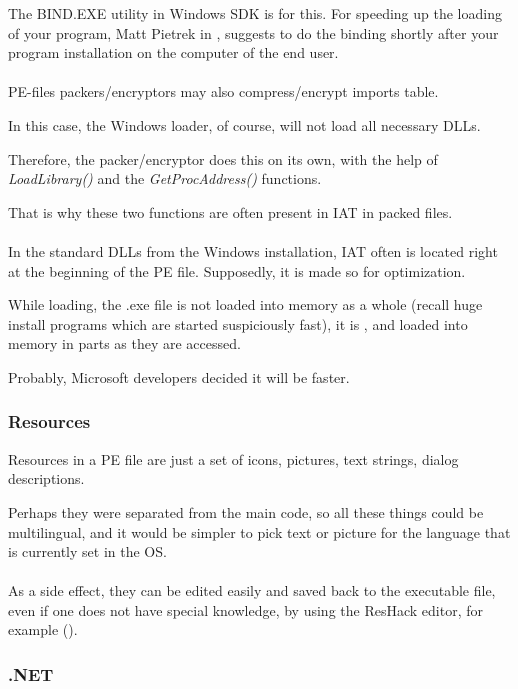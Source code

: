 The BIND.EXE utility in Windows SDK is for this.
For speeding up the loading of your program, Matt Pietrek in \PietrekPEURL, suggests to do the binding shortly after your program
installation on the computer of the end user. \\
\\
PE-files packers/encryptors may also compress/encrypt imports table.

In this case, the Windows loader, of course, will not load all necessary DLLs.

Therefore, the packer/encryptor does this on its own, with the help of
\emph{LoadLibrary()} and the \emph{GetProcAddress()} functions.

That is why these two functions are often present in \ac{IAT} in packed files.\\
\\
In the standard DLLs from the Windows installation, \ac{IAT} often is located right at the beginning of the PE file.
Supposedly, it is made so for optimization.

While loading, the .exe file is not loaded into memory as a whole (recall huge install programs which are
started suspiciously fast), it is , and loaded into memory in parts as they are accessed.

Probably, Microsoft developers decided it will be faster.

\subsubsection{Resources}

\label{PEresources}

Resources in a PE file are just a set of icons, pictures, text strings, dialog descriptions.

Perhaps they were separated from the main code, so all these things could be multilingual,
and it would be simpler to pick text or picture for the language that is currently set in the \ac{OS}. \\
\\
As a side effect, they can be edited easily and saved back to the executable file, even if one does not have special knowledge,
by using the ResHack editor, for example ().

\subsubsection{.NET}

